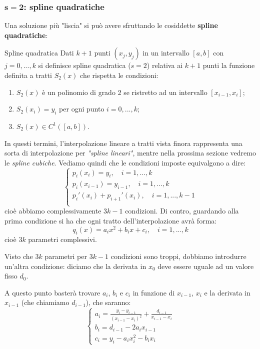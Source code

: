\documentclass[a4paper,11pt]{article}
\begin{document}
\subsubsection{$\mathbf{s = 2}$: spline quadratiche}
Una soluzione più "liscia" si può avere sfruttando le cosiddette \textbf{spline quadratiche}:
\begin{definition}{Spline quadratica}
	Dati $k + 1$ punti $(x_j, y_j)$ in un intervallo $[a, b]$ con $j = 0, ..., k$ si definisce spline quadratica ($s = 2$) relativa ai $k + 1$ punti la funzione definita a tratti $S_2(x)$ che rispetta le condizioni:
	\begin{enumerate}
		\item $S_2(x)$ è un polinomio di grado 2 se ristretto ad un intervallo $[x_{i - 1}, x_i]$;
		\item $S_2(x_i) = y_i$ per ogni punto $i = 0, ..., k$;
		\item $S_2(x) \in C^1([a, b])$.
	\end{enumerate}
\end{definition}
In questi termini, l'interpolazione lineare a tratti vista finora rappresenta una sorta di interpolazione per \textit{"spline lineari"}, mentre nella prossima sezione vedremo le \textit{spline cubiche}.
Vediamo quindi che le condizioni imposte equivalgono a dire:
\[
	\begin{cases}
		p_i(x_i) = y_i, \quad i = 1, ..., k \\ 
		p_i(x_{i - 1}) = y_{i - 1}, \quad i = 1, ..., k \\ 
		p_i'(x_i) + p_{i + 1}'(x_i), \quad i = 1, ..., k - 1 \\ 
	\end{cases}
\]
cioè abbiamo complessivamente $3k - 1$ condizioni.
Di contro, guardando alla prima condizione si ha che ogni tratto dell'interpolazione avrà forma:
$$
q_i(x) = a_i x^2 + b_i x + c_i, \quad i = 1, ..., k
$$
cioè $3k$ parametri complessivi.

Visto che $3k$ parametri per $3k - 1$ condizioni sono troppi, dobbiamo introdurre un'altra condizione: diciamo che la derivata in $x_0$ deve essere uguale ad un valore fisso $d_0$.

A questo punto basterà trovare $a_i$, $b_i$ e $c_i$ in funzione di $x_{i - 1}$, $x_i$ e la derivata in $x_{i - 1}$ (che chiamiamo $d_{i-1}$), che saranno:
\[
	\begin{cases}
		a_i  =\frac{y_{i}-y_{i-1}}{\left(x_{i-1}-x_{i}\right)^{2}}+\frac{d_{i-1}}{x_{i-1}-x_{i}} \\ 
		b_i = d_{i - 1} -2a_ix_{i-1} \\
		c_i = y_{i}-a_ix_{i}^{2}-b_ix_{i}
	\end{cases}
\]
\end{document}
